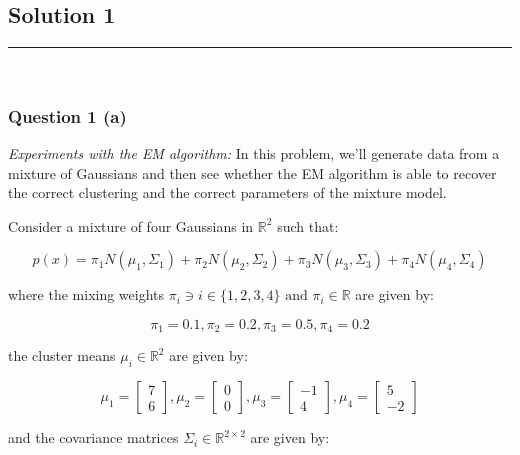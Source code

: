 \documentclass{article}
\begin{document}
\pagestyle{fancy}

\subsection*{Solution 1}
\noindent\rule{\textwidth}{0.4pt}\\
\subsubsection*{Question 1 (a)}
\begin{flushleft}
\textit{Experiments with the EM algorithm:} In this problem, we'll generate data from a mixture of Gaussians and then see whether the EM algorithm is able to recover the correct clustering and the correct parameters of the mixture model.
\end{flushleft}
\begin{flushleft}
    Consider a mixture of four Gaussians in $\mathbb{R}^2$ such that:
\end{flushleft}
$$p(x) = \pi_1 N(\mu_1, \Sigma_1) + \pi_2 N(\mu_2, \Sigma_2) + \pi_3 N(\mu_3, \Sigma_3) + \pi_4 N(\mu_4, \Sigma_4)$$
\begin{flushleft}
    where the mixing weights $\pi_i \ni i \in \{1,2,3,4\} \text{ and } \pi_i \in \mathbb{R}$ are given by:
\end{flushleft}
$$\pi_1 = 0.1, \pi_2 = 0.2, \pi_3 = 0.5, \pi_4 = 0.2$$
\begin{flushleft}
    the cluster means $\mu_i \in \mathbb{R}^2$ are given by:
\end{flushleft}
$$\mu_1 = \begin{bmatrix}7 \\ 6\end{bmatrix}, \mu_2 = \begin{bmatrix}0 \\ 0\end{bmatrix}, \mu_3 = \begin{bmatrix}-1 \\ 4\end{bmatrix}, \mu_4 = \begin{bmatrix}5 \\ -2\end{bmatrix}$$
\begin{flushleft}
    and the covariance matrices $\Sigma_i \in \mathbb{R}^{2 \times 2}$ are given by:
\end{flushleft}
\end{document}
